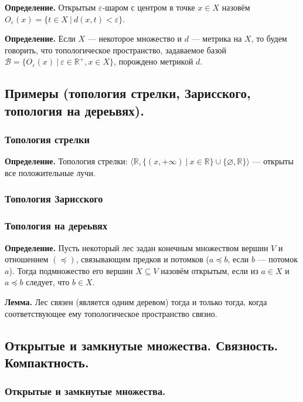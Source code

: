 \documentclass[10pt,a4paper,oneside]{article}
\begin{document}
\noindent \textbf{ Определение. }
Открытым $\varepsilon$-шаром с центром в точке $x \in X$ назовём $O_\varepsilon(x) = \{ t \in X\ |\ d(x,t) < \varepsilon \}$.


\noindent \textbf{ Определение. }
Если $X$ --- некоторое множество и $d$ --- метрика на $X$, то будем говорить, что топологическое
пространство, задаваемое базой $\mathcal{B} = \{ O_\varepsilon(x)\ |\ \varepsilon \in \mathbb{R}^+, x \in X \}$,
порождено метрикой $d$.

\subsection{Примеры (топология стрелки, Зарисского, топология на дереьвях). }
\subsubsection{Топология стрелки}


\noindent \textbf{ Определение. } Топология стрелки: $\langle \mathbb{R}, \{(x,+\infty)\ |\ x\in\mathbb{R}\}\cup\{\varnothing,\mathbb{R}\}\rangle$ --- открыты все положительные лучи.


\subsubsection{Топология Зарисского}

\subsubsection{Топология на дереьвях}

\noindent \textbf{ Определение. } Пусть некоторый лес задан конечным множеством вершин $V$ и
отношением $(\preceq)$, связывающим предков и потомков ($a \preceq b$, если $b$ --- потомок $a$). Тогда подмножество его вершин $X\subseteq V$ назовём открытым, 
если из $a \in X$ и $a \preceq b$ следует, что $b \in X$.

\noindent \textbf{ Лемма. } Лес связен (является одним деревом) тогда и только тогда, когда соответствующее ему 
топологическое пространство связно.

\subsection{Открытые и замкнутые множества. Связность. Компактность. }

\subsubsection{Открытые и замкнутые множества.}
\end{document}
